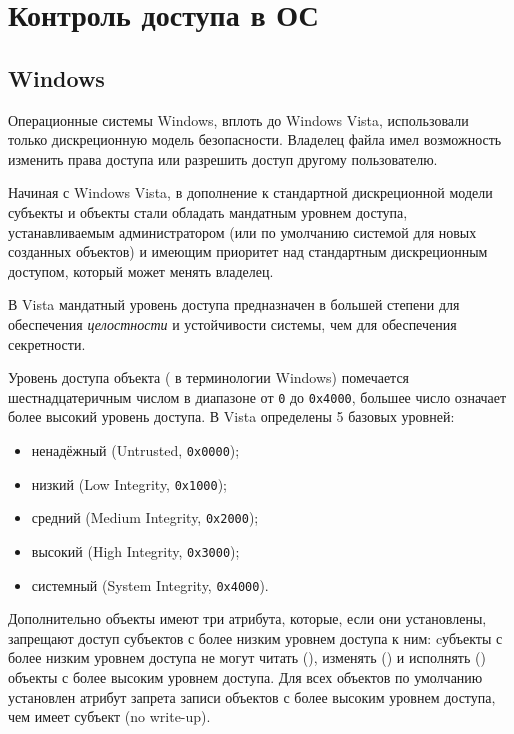 \section{Контроль доступа в ОС}

\subsection{Windows}

Операционные системы Windows, вплоть до Windows Vista, использовали только дискреционную модель безопасности. Владелец файла имел возможность изменить права доступа или разрешить доступ другому пользователю.

Начиная с Windows Vista, в дополнение к стандартной дискреционной модели субъекты и объекты стали обладать мандатным уровнем доступа, устанавливаемым администратором (или по умолчанию системой для новых созданных объектов) и имеющим приоритет над стандартным дискреционным доступом, который может менять владелец.

В Vista мандатный уровень доступа предназначен в большей степени для обеспечения \emph{целостности} и устойчивости системы, чем для обеспечения секретности.

Уровень доступа объекта ( в терминологии Windows) помечается шестнадцатеричным числом в диапазоне от \texttt{0} до \texttt{0x4000}, большее число означает более высокий уровень доступа. В Vista определены 5 базовых уровней:
\begin{itemize}
    \item ненадёжный (Untrusted, \texttt{0x0000});
    \item низкий (Low Integrity, \texttt{0x1000});
    \item средний (Medium Integrity, \texttt{0x2000});
    \item высокий (High Integrity, \texttt{0x3000});
    \item системный (System Integrity, \texttt{0x4000}).
\end{itemize}

Дополнительно объекты имеют три атрибута, которые, если они установлены, запрещают доступ субъектов с более низким уровнем доступа к ним: cубъекты с более низким уровнем доступа не могут читать (), изменять () и исполнять () объекты с более высоким уровнем доступа. Для всех объектов по умолчанию установлен атрибут запрета записи объектов с более высоким уровнем доступа, чем имеет субъект (no write-up).


